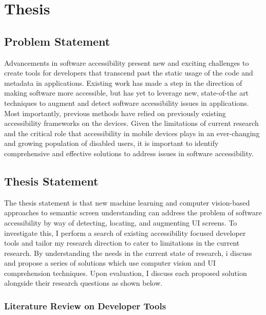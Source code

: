 \newpage
\section{Thesis}
\label{sec:thesis}

\subsection{Problem Statement}
Advancements in software accessibility present new and exciting challenges to create tools for developers that transcend past the static usage of the code and metadata in applications. Existing work has made a step in the direction of making software more accessible, but has yet to leverage new, state-of-the art techniques to augment and detect software accessibility issues in applications. Most importantly, previous methods have relied on previously existing accessibility frameworks on the devices. Given the limitations of current research and the critical role that accessibility in mobile devices plays in an ever-changing and growing population of disabled users, it is important to identify comprehensive and effective solutions to address issues in software accessibility. 


\subsection{Thesis Statement}

The thesis statement is that new machine learning and computer vision-based approaches to semantic screen understanding can address the problem of software accessibility by way of detecting, locating, and augmenting UI screens. To investigate this, I perform a search of existing accessibility focused developer tools and tailor my research direction to cater to limitations in the current research. By understanding the needs in the current state of research, i discuss and propose a series of solutions which use computer vision and UI comprehension techniques. Upon evaluation, I discuss each proposed solution alongside their research questions as shown below. 


\subsubsection{Literature Review on Developer Tools}

